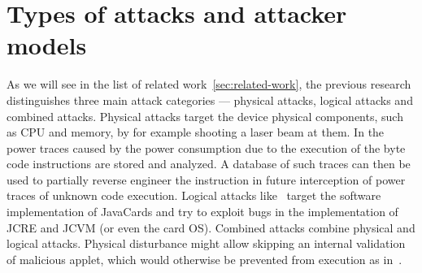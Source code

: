





    \section{Types of attacks and attacker models}

    As we will see in the list of related work~\ref{sec:related-work}, the previous research distinguishes three main attack categories --- physical attacks, logical attacks and combined attacks. Physical attacks target the device physical components, such as CPU and memory, by for example shooting a laser beam at them. In \cite{Prpič2010thesis} the power traces caused by the power consumption due to the execution of the byte code instructions are stored and analyzed. A database of such traces can then be used to partially reverse engineer the instruction in future interception of power traces of unknown code execution.
    Logical attacks like~\cite{hogenboom} target the software implementation of JavaCards and try to exploit bugs in the implementation of JCRE and JCVM (or even the card OS). Combined attacks combine physical and logical attacks. Physical disturbance might allow skipping an internal validation of malicious applet, which would otherwise be prevented from execution as in~\cite{barbusecond}.



